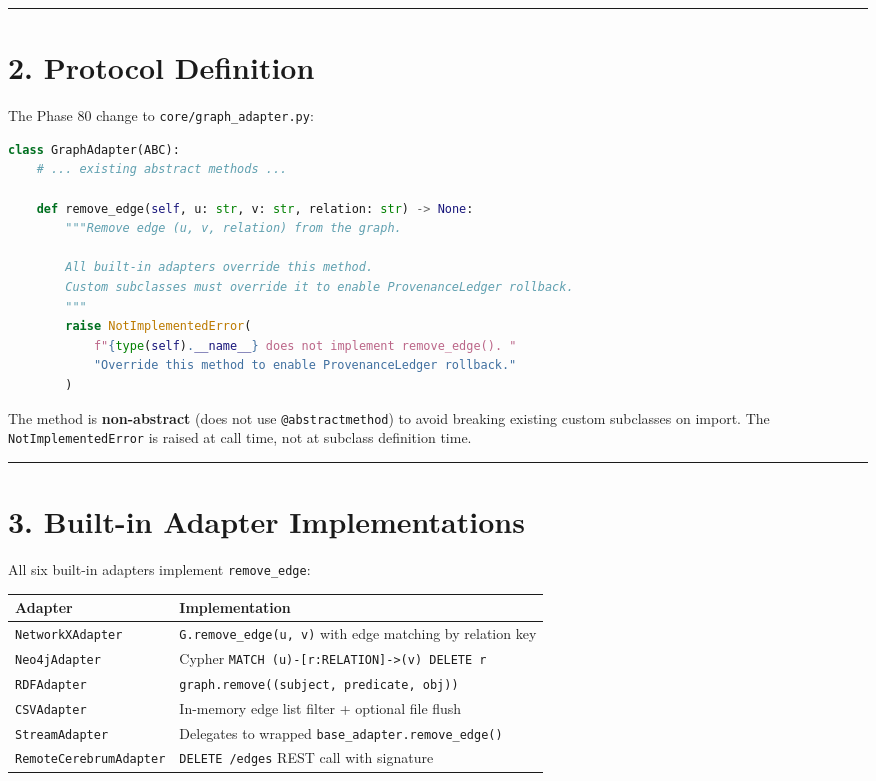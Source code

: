 \medskip\noindent\rule{\linewidth}{0.4pt}\medskip

\section*{2. Protocol Definition}

The Phase 80 change to \texttt{core/graph\_adapter.py}:

\begin{lstlisting}[language=Python]
class GraphAdapter(ABC):
    # ... existing abstract methods ...

    def remove_edge(self, u: str, v: str, relation: str) -> None:
        """Remove edge (u, v, relation) from the graph.

        All built-in adapters override this method.
        Custom subclasses must override it to enable ProvenanceLedger rollback.
        """
        raise NotImplementedError(
            f"{type(self).__name__} does not implement remove_edge(). "
            "Override this method to enable ProvenanceLedger rollback."
        )
\end{lstlisting}

The method is \textbf{non-abstract} (does not use \texttt{@abstractmethod}) to avoid breaking existing custom subclasses on import. The \texttt{NotImplementedError} is raised at call time, not at subclass definition time.

\medskip\noindent\rule{\linewidth}{0.4pt}\medskip

\section*{3. Built-in Adapter Implementations}

All six built-in adapters implement \texttt{remove\_edge}:

\begin{table}[h]
\small\centering
\begin{tabular}{ll}
\toprule
Adapter & Implementation \\
\midrule
\texttt{NetworkXAdapter} & \texttt{G.remove\_edge(u, v)} with edge matching by relation key \\
\texttt{Neo4jAdapter} & Cypher \texttt{MATCH (u)-[r:RELATION]->(v) DELETE r} \\
\texttt{RDFAdapter} & \texttt{graph.remove((subject, predicate, obj))} \\
\texttt{CSVAdapter} & In-memory edge list filter + optional file flush \\
\texttt{StreamAdapter} & Delegates to wrapped \texttt{base\_adapter.remove\_edge()} \\
\texttt{RemoteCerebrumAdapter} & \texttt{DELETE /edges} REST call with signature \\
\bottomrule
\end{tabular}
\end{table}



